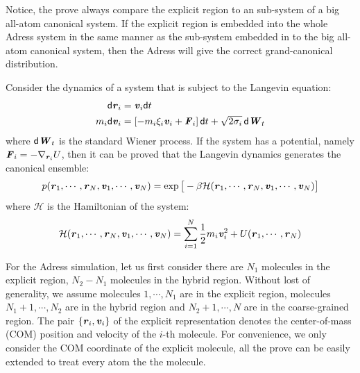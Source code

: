 \documentclass[aps,pre,preprint,unsortedaddress]{revtex4}
\renewcommand{\v}[1]{\textbf{\textit{#1}}}
\renewcommand{\d}[1]{\textsf{#1}}
\begin{document}
Notice, the prove always compare the explicit region to an sub-system
of a big all-atom canonical system. If the explicit region is embedded
into the whole Adress system in the same manner as the sub-system
embedded in to the big all-atom canonical system, then the Adress will
give the correct grand-canonical distribution.


Consider the dynamics of a system that is subject to the Langevin equation:
\begin{align}
  \d d\v r_i &= \v v_i\d dt\\
  m_i\d d\v v_i &= [-m_i\xi_i\v v_i + \v F_i]\,\d dt + \sqrt{2\sigma_i}\,\d d\v W_t
\end{align}
where $\d d\v W_t$ is the standard Wiener process.  If the system has a
potential, namely $\v F_i = -\nabla_{\v r_i}U$, then it can be proved that the
Langevin dynamics generates the canonical ensemble:
\begin{align}
  p(\v r_1, \cdots, \v r_N, \v v_1, \cdots, \v v_N)
  = \exp\big[
  -\beta \mathcal H(\v r_1, \cdots, \v r_N, \v v_1, \cdots, \v v_N)
  \big]
\end{align}
where $\mathcal H$ is the Hamiltonian of the system:
\begin{align}
  \mathcal H(\v r_1, \cdots, \v r_N, \v v_1, \cdots, \v v_N)
  =
  \sum_{i=1}^N\frac12 m_i\v v_i^2 + U(\v r_1, \cdots, \v r_N)  
\end{align}

For the Adress simulation, let us first consider there are $N_1$
molecules in the explicit region, $N_2 - N_1$ molecules in the hybrid
region.  Without lost of generality, we assume molecules $1, \cdots,
N_1$ are in the explicit region, molecules $N_1 + 1, \cdots, N_2$ are
in the hybrid region and $N_2+1, \cdots, N$ are in the coarse-grained
region. The pair $\{\v r_i, \v v_i\}$ of the explicit representation
denotes the center-of-mass (COM) position and velocity of the $i$-th
molecule. For convenience, we only consider the COM coordinate of the
explicit molecule, all the prove can be easily extended to treat every
atom the the molecule.
\end{document}
